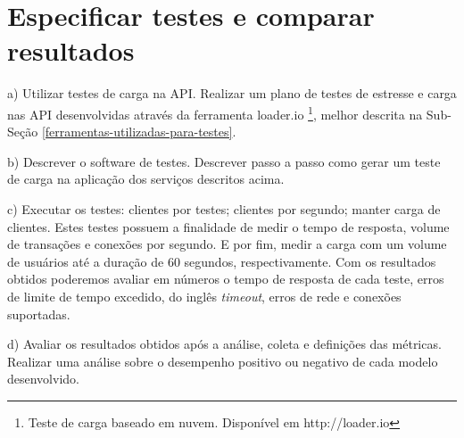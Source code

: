\section{Especificar testes e comparar resultados}

  \begin{compactitem}
    \item[a)] Utilizar testes de carga na \ac{API}. Realizar um plano de testes de 
    estresse e carga nas \ac{API} desenvolvidas através
    da ferramenta loader.io \footnote{Teste de carga baseado em nuvem. Disponível em http://loader.io},
    melhor descrita na Sub-Seção \ref{ferramentas-utilizadas-para-testes}.
    
    \item[b)] Descrever o software de testes. Descrever passo a passo como gerar um teste de carga 
    na aplicação dos serviços descritos acima.
    
    \item[c)] Executar os testes: clientes por testes; clientes por segundo; manter carga de clientes.
    Estes testes possuem a finalidade de medir o tempo de resposta, volume de transações e conexões por segundo. E por fim, 
    medir a carga com um volume de usuários até a duração de 60 segundos, respectivamente. 
    Com os resultados obtidos poderemos avaliar em números o tempo de resposta de cada teste,
    erros de limite de tempo excedido, do inglês \textit{timeout}, erros de rede e conexões suportadas. 
    
    \item[d)] Avaliar os resultados obtidos após a análise, coleta e definições das métricas. Realizar uma análise sobre o 
    desempenho positivo ou negativo de cada modelo desenvolvido.
    
    
  \end{compactitem}



